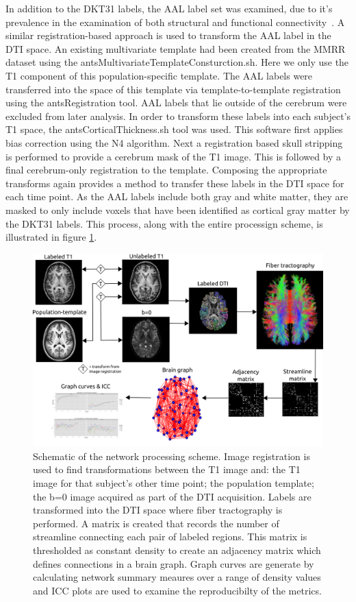 \documentclass{frontiersSCNS} %
\begin{document}
In addition to the DKT31 labels, the AAL label set was examined, due to it's prevalence in
the examination of both structural and functional connectivity~\citep{Tzourio-Mazoyer2002}. 
A similar registration-based approach is used to transform the AAL label in the DTI space.
An existing multivariate template had been created from the MMRR dataset using the
antsMultivariateTemplateConsturction.sh. Here we only use the T1 component of this
population-specific template. The AAL labels were transferred into the space of this template
via template-to-template registration using the antsRegistration tool. AAL labels that lie outside
of the cerebrum were excluded from later analysis. In order to transform these labels into each 
subject's T1 space, the antsCorticalThickness.sh tool was used. This software first applies bias
correction using the N4 algorithm. Next a registration based skull stripping is performed to provide
a cerebrum mask of the T1 image. This is followed by a final cerebrum-only registration to the template.
Composing the appropriate transforms again provides a method to transfer these labels in the DTI space for each time point. 
As the AAL labels include both gray and white matter, they are masked to only include voxels 
that have been identified as cortical gray matter by the DKT31 labels. This process, along with the
entire processign scheme, is illustrated in figure \ref{fig:scheme}.

\begin{figure}
\begin{center}
\includegraphics[width=\linewidth]{figures/flow.png} 
\caption{Schematic of the network processing scheme. Image registration is used to find transformations between the T1 image and: the T1 image for that subject's other time point; the population template; the b=0 image acquired as part of the DTI acquisition. Labels are transformed into the DTI space where fiber tractography is performed. A matrix is created that records the number of streamline connecting each pair of labeled regions. This matrix is thresholded as constant density to create an adjacency matrix which defines connections in a brain graph. Graph curves are generate by calculating network summary meaures over a range of density values and ICC plots are used to examine the reproducibilty of the metrics.}
\label{fig:scheme}
\end{center}
\end{figure}
\end{document}
